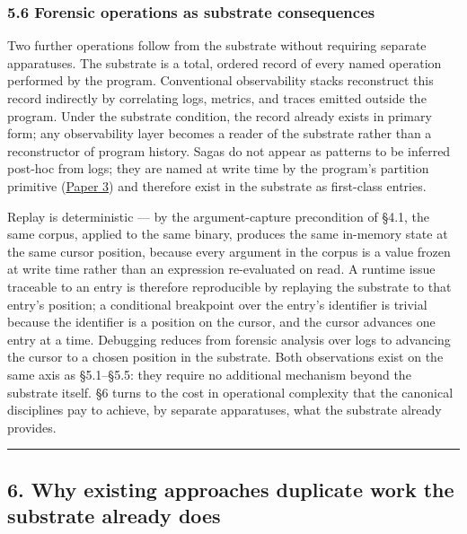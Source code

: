 \documentclass[
]{article}
\begin{document}
\subsubsection{5.6 Forensic operations as substrate
consequences}\label{forensic-operations-as-substrate-consequences}

Two further operations follow from the substrate without requiring
separate apparatuses. The substrate is a total, ordered record of every
named operation performed by the program. Conventional observability
stacks reconstruct this record indirectly by correlating logs, metrics,
and traces emitted outside the program. Under the substrate condition,
the record already exists in primary form; any observability layer
becomes a reader of the substrate rather than a reconstructor of program
history. Sagas do not appear as patterns to be inferred post-hoc from
logs; they are named at write time by the program's partition primitive
(\href{03-reactions-and-partition.md}{Paper 3}) and therefore exist in
the substrate as first-class entries.

Replay is deterministic --- by the argument-capture precondition of
§4.1, the same corpus, applied to the same binary, produces the same
in-memory state at the same cursor position, because every argument in
the corpus is a value frozen at write time rather than an expression
re-evaluated on read. A runtime issue traceable to an entry is therefore
reproducible by replaying the substrate to that entry's position; a
conditional breakpoint over the entry's identifier is trivial because
the identifier is a position on the cursor, and the cursor advances one
entry at a time. Debugging reduces from forensic analysis over logs to
advancing the cursor to a chosen position in the substrate. Both
observations exist on the same axis as §5.1--§5.5: they require no
additional mechanism beyond the substrate itself. §6 turns to the cost
in operational complexity that the canonical disciplines pay to achieve,
by separate apparatuses, what the substrate already provides.

\begin{center}\rule{0.5\linewidth}{0.5pt}\end{center}

\subsection{6. Why existing approaches duplicate work the substrate
already
does}\label{why-existing-approaches-duplicate-work-the-substrate-already-does}
\end{document}
